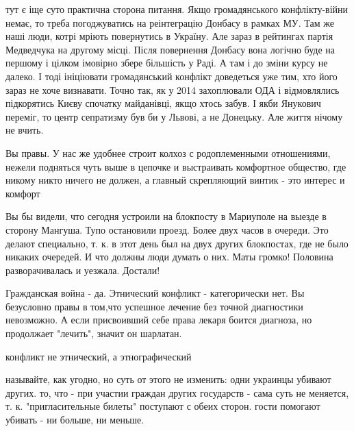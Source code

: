 \begin{itemize}

тут є іще суто практична сторона питання. Якщо громадянського конфлікту-війни
немає, то треба погоджуватись на реінтеграцію Донбасу в рамках МУ. Там же наші
люди, котрі мріють повернутись в Україну. Але зараз в рейтингах партія
Медведчука на другому місці. Після повернення Донбасу вона логічно буде на
першому і цілком імовірно збере більшість у Раді. А там і до зміни курсу не
далеко. І тоді ініціювати громадянський конфлікт доведеться уже тим, хто його
зараз не хоче визнавати. Точно так, як у 2014 захоплювали ОДА і відмовлялись
підкорятись Києву спочатку майданівці, якщо хтось забув. І якби Янукович
переміг, то центр сепратизму був би у Львові, а не Донецьку. Але життя нічому
не вчить.

\begin{itemize} %

Вы правы. У нас же удобнее строит колхоз с родоплеменными отношениями, нежели
подняться чуть выше в цепочке и выстраивать комфортное общество, где никому
никто ничего не должен, а главный скрепляющий винтик - это интерес и комфорт

\end{itemize} %


Вы бы видели, что сегодня устроили на блокпосту в Мариуполе на выезде в сторону
Мангуша. Тупо остановили проезд. Более двух часов в очереди. Это делают
специально, т. к. в этот день был на двух других блокпостах, где не было никаких
очередей. И что должны люди думать о них. Маты громко! Половина разворачивалась и
уезжала. Достали!



Гражданская война - да. Этнический конфликт - категорически нет. Вы безусловно
правы в том,что успешное лечение без точной диагностики невозможно. А если
присвоивший себе права лекаря боится диагноза, но продолжает "лечить", значит он
шарлатан.

\begin{itemize} %
конфликт не этнический, а этнографический
\end{itemize} %


называйте, как угодно, но суть от этого не изменить: одни украинцы убивают
других. то, что - при участии граждан других государств - сама суть не
меняется, т. к. "пригласительные билеты" поступают с обеих сторон. гости помогают
убивать - ни больше, ни меньше.


\end{itemize}

